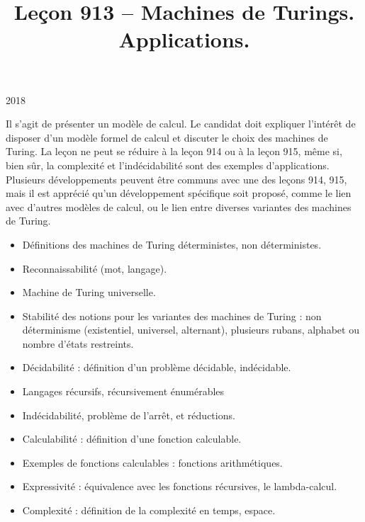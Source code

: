 \documentclass{agregfiche}
\title{Leçon 913 -- Machines de Turings. Applications.}
\begin{document}
\maketitle

\secrapports

\begin{rapport}{2018}

Il s'agit de présenter un modèle de calcul.
Le candidat doit expliquer l'intérêt de disposer d'un modèle formel de calcul et discuter le choix des machines de Turing.
La leçon ne peut se réduire à la leçon 914 ou à la leçon 915, même si, bien sûr, la complexité et l'indécidabilité sont des exemples d'applications.
Plusieurs développements peuvent être communs avec une des leçons 914, 915, mais il est apprécié qu'un développement spécifique soit proposé, comme le lien avec d'autres modèles de calcul, ou le lien entre diverses variantes des machines de Turing.

\end{rapport}

\secindispensables

\begin{itemize}
    \item Définitions des machines de Turing déterministes, non déterministes.
    \item Reconnaissabilité (mot, langage).
    \item Machine de Turing universelle.
\end{itemize}


\secasavoir


\begin{itemize}
  	\item Stabilité des notions pour les variantes des machines de Turing : non
    déterminisme (existentiel, universel, alternant), 
    plusieurs rubans, alphabet ou nombre d'états restreints.
	\item Décidabilité : définition d'un problème décidable, indécidable.
	\item Langages récursifs, récursivement énumérables
	\item Indécidabilité, problème de l'arrêt,  et réductions.
	\item Calculabilité : définition d'une fonction calculable.
	\item Exemples de fonctions calculables : fonctions arithmétiques.
	\item Expressivité : équivalence avec les fonctions récursives, le lambda-calcul.
	\item Complexité : définition de la complexité en temps, espace.
\end{itemize}
\end{document}
